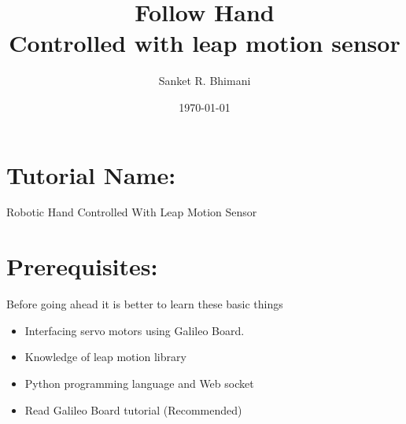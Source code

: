 \documentclass[11pt,a4paper]{article}
\title{\textbf{\Huge{Follow Hand}}\vspace{6mm}\\Controlled with leap motion sensor}
\author{Sanket R. Bhimani}
\date{\today}
\newcommand\tab[1][1cm]{\hspace*{#1}}
\begin{document}
	\maketitle
	\newpage
	\tableofcontents
	\newpage
	\section{Tutorial Name:}
	\begin{center}\huge{Robotic Hand Controlled With Leap Motion Sensor}\end{center}
	\tab{This tutorial will help you to making robotic hand which will be controlled with leap motion sensor. Means whatever you perform on leap motion sensor, your hand will perform same thing}
	\vspace{15mm}
	\section{Prerequisites:}
	\vspace{1cm}
	\tab Before going ahead it is better to learn these basic things
    \vspace{1cm}
	\begin{itemize}
	    \item Interfacing servo motors using Galileo Board.
	    \item Knowledge of leap motion library
	    \item Python programming language  and Web socket
	    \item Read Galileo Board tutorial (Recommended)
	\end{itemize}
	\newpage
\end{document}
